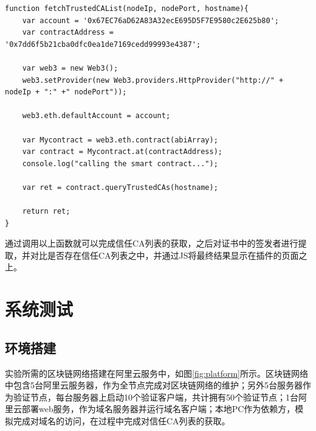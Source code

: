 \begin{lstlisting}[caption={获取信任CA函数实现}, label={code:fetchTrustedCAList}]
function fetchTrustedCAList(nodeIp, nodePort, hostname){
    var account = '0x67EC76aD62A83A32ecE695D5F7E9580c2E625b80'; 
    var contractAddress = '0x7dd6f5b21cba0dfc0ea1de7169cedd99993e4387';

    var web3 = new Web3();
    web3.setProvider(new Web3.providers.HttpProvider("http://" + nodeIp + ":" +" nodePort"));

    web3.eth.defaultAccount = account;

    var Mycontract = web3.eth.contract(abiArray);
    var contract = Mycontract.at(contractAddress); 
    console.log("calling the smart contract...");

    var ret = contract.queryTrustedCAs(hostname);

    return ret;
}
\end{lstlisting}

通过调用以上函数就可以完成信任CA列表的获取，之后对证书中的签发者进行提取，并对比是否存在信任CA列表之中，并通过JS将最终结果显示在插件的页面之上。






	





\section{系统测试}


\subsection{环境搭建}



实验所需的区块链网络搭建在阿里云服务中，如图\ref{fig:platform}所示。区块链网络中包含5台阿里云服务器，作为全节点完成对区块链网络的维护；另外5台服务器作为验证节点，每台服务器上启动10个验证客户端，共计拥有50个验证节点；1台阿里云部署web服务，作为域名服务器并运行域名客户端；本地PC作为依赖方，模拟完成对域名的访问，在过程中完成对信任CA列表的获取。

